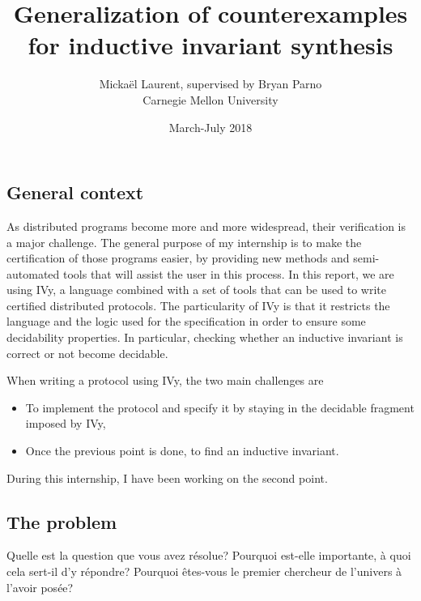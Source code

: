 \documentclass{article}
\newenvironment{point}[1]%
{\subsection*{#1}}%
{}
\begin{document}

\title{Generalization of counterexamples for inductive invariant synthesis}

\author{Mickaël Laurent, supervised by Bryan Parno\\Carnegie Mellon University}

\date{March-July 2018}

\maketitle

\pagestyle{empty} %
\thispagestyle{empty}



\begin{point}{General context}
  
  As distributed programs become more and more widespread, their verification is a major challenge.
  The general purpose of my internship is to make the certification of those programs easier, by providing new methods and semi-automated tools that will assist the user in this process.
  In this report, we are using IVy, a language combined with a set of tools that can be used to write certified distributed protocols.
  The particularity of IVy is that it restricts the language and the logic used for the specification in order to ensure some decidability properties.
  In particular, checking whether an inductive invariant is correct or not become decidable.

  When writing a protocol using IVy, the two main challenges are
  \begin{itemize}
    \item To implement the protocol and specify it by staying in the decidable fragment imposed by IVy,
    \item Once the previous point is done, to find an inductive invariant.
  \end{itemize}

  During this internship, I have been working on the second point.

\end{point}

\begin{point}{The problem}
  

  Quelle est la question que vous avez résolue? Pourquoi est-elle
  importante, à quoi cela sert-il d'y répondre?  Pourquoi êtes-vous
  le premier chercheur de l'univers à l'avoir posée?

\end{point}
\end{document}
